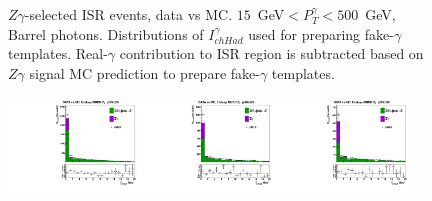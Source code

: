 \begin{figure}[htb]
\begin{center}
  \caption{$Z\gamma$-selected ISR events, data vs MC. $15$~GeV$<P_T^{\gamma}<500$~GeV, Barrel photons. Distributions of $I_{chHad}^{\gamma}$ used for preparing fake-$\gamma$ templates. Real-$\gamma$ contribution to ISR region is subtracted based on $Z\gamma$ signal MC prediction to prepare fake-$\gamma$ templates.}
  \label{fig:Zg_ISR_phoPFChIsoCorr_Barrel}
  \end{center}
\end{figure}

\begin{figure}[htb]
  \begin{center}
   \includegraphics[width=0.32\textwidth]{../figs/figs_v11/MUON_ZGamma/PrepareYields/c_TotalDATAvsMC_Endcap__phoPFChIsoCorrFSR_EXCLUDED_pt15to20_.pdf}\includegraphics[width=0.32\textwidth]{../figs/figs_v11/MUON_ZGamma/PrepareYields/c_TotalDATAvsMC_Endcap__phoPFChIsoCorrFSR_EXCLUDED_pt20to25_.pdf}\includegraphics[width=0.32\textwidth]{../figs/figs_v11/MUON_ZGamma/PrepareYields/c_TotalDATAvsMC_Endcap__phoPFChIsoCorrFSR_EXCLUDED_pt25to30_.pdf}\\

\end{center}
\end{figure}
